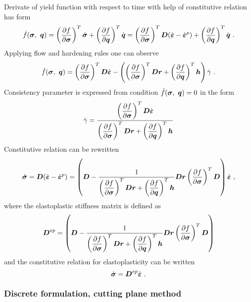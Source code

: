 Derivate of yield function with respect to time with help of constitutive relation has form
\begin{equation}
\dot{f}(\mbf{\sigma},\ \mbf{q}) = \left(\ppd{f}{\mbf{\sigma}}\right)^T \dot{\mbf{\sigma}} +
\left(\ppd{f}{\mbf{q}}\right)^T \dot{\mbf{q}} = \left(\ppd{f}{\mbf{\sigma}}\right)^T \mbf{D}
(\dot{\mbf{\varepsilon}} - \dot{\mbf{\varepsilon}}^{p}) + \left(\ppd{f}{\mbf{q}}\right)^T \dot{\mbf{q}}\ .
\end{equation}
Applying flow and hardening rules one can observe
\begin{equation}
\dot{f}(\mbf{\sigma},\ \mbf{q}) = \left(\ppd{f}{\mbf{\sigma}}\right)^T \mbf{D} \dot{\mbf{\varepsilon}} -
\left(\left(\ppd{f}{\mbf{\sigma}}\right)^T \mbf{D} \mbf{r} + \left(\ppd{f}{\mbf{q}}\right)^T \mbf{h}\right) \dot{\gamma}\ .
\end{equation}
Consistency parameter is expressed from condition $\dot{f}(\mbf{\sigma},\ \mbf{q})=0$ in the form
\begin{equation}
\dot{\gamma} = \del{\left(\ppd{f}{\mbf{\sigma}}\right)^T \mbf{D} \dot{\mbf{\varepsilon}}}
{\left(\ppd{f}{\mbf{\sigma}}\right)^T \mbf{D} \mbf{r} + \left(\ppd{f}{\mbf{q}}\right)^T \mbf{h}}
\end{equation}
Constitutive relation can be rewritten
\begin{equation}
\dot{\mbf{\sigma}} = \mbf{D}(\dot{\mbf{\varepsilon}} - \dot{\mbf{\varepsilon}}^{p}) =
\left(\mbf{D} - \del{1}{\left(\ppd{f}{\mbf{\sigma}}\right)^T \mbf{D} \mbf{r} + \left(\ppd{f}{\mbf{q}}\right)^T \mbf{h}}
\mbf{D} \mbf{r} \left(\ppd{f}{\mbf{\sigma}}\right)^T \mbf{D}\right) \dot{\mbf{\varepsilon}}\ ,
\end{equation}
where the elastoplastic stiffness matrix  is defined as
\begin{equation}
\mbf{D}^{ep} = \left(\mbf{D} - \del{1}{\left(\ppd{f}{\mbf{\sigma}}\right)^T \mbf{D} \mbf{r} + 
\left(\ppd{f}{\mbf{q}}\right)^T \mbf{h}} \mbf{D} \mbf{r} \left(\ppd{f}{\mbf{\sigma}}\right)^T \mbf{D}\right)
\end{equation}
and the constitutive relation for elastoplasticity can be written
\begin{equation}
\dot{\mbf{\sigma}} = \mbf{D}^{ep} \dot{\mbf{\varepsilon}}\ .
\end{equation}

\subsubsection{Discrete formulation, cutting plane method}
\label{sectcutplanemet}

